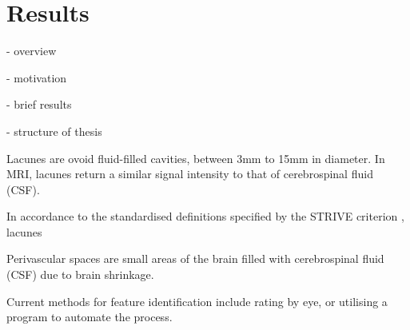 \section{Results}\label{intro-results}


- overview

- motivation

- brief results

- structure of thesis


Lacunes are ovoid fluid-filled cavities, between 3mm to 15mm in diameter. In MRI, lacunes return a similar signal intensity to that of cerebrospinal fluid (CSF).


In accordance to the standardised definitions specified by the STRIVE criterion \cite{WardlawJ.M.2013Nsfr}, lacunes  


Perivascular spaces are small areas of the brain filled with cerebrospinal fluid (CSF) due to brain shrinkage.

Current methods for feature identification include rating by eye, or utilising a program to automate the process.








%